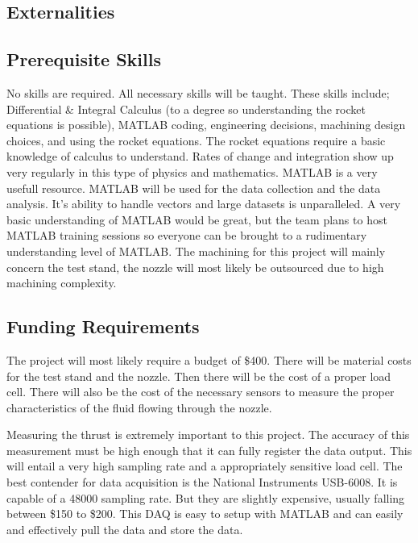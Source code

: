 \documentclass[conference]{IEEEtran} %
\begin{document}
\begin{}
\section{Externalities}
\subsection{Prerequisite Skills}
No skills are required. All necessary skills will be taught. These skills include; Differential \& Integral Calculus (to a degree so understanding the rocket equations is possible), MATLAB coding, engineering decisions, machining design choices, and using the rocket equations. The rocket equations
require a basic knowledge of calculus to understand. Rates of change and integration show up very regularly in this type of physics and mathematics. MATLAB
is a very usefull resource. MATLAB will be used for the data collection and the data analysis. It's ability to handle vectors and large datasets is unparalleled.
A very basic understanding of MATLAB would be great, but the team plans to host MATLAB training sessions so everyone can be brought to a rudimentary understanding
level of MATLAB\@. The machining for this project will mainly concern the test stand, the nozzle will most likely be outsourced due to high machining complexity.

\subsection{Funding Requirements}
The project will most likely require a budget of \$400. There will be material costs for the test stand and the nozzle.
Then there will be the cost of a proper load cell. There will also be the cost of the necessary sensors to measure
 the proper characteristics of the fluid flowing through the nozzle.

Measuring the thrust is extremely important to this project. The accuracy of this measurement must be high enough that it can fully register the data output. This will
entail a very high sampling rate and a appropriately sensitive load cell. The best contender for data acquisition is the National Instruments USB-6008. It is capable of
a 48000 sampling rate. But they are slightly expensive, usually falling between \$150 to \$200. This DAQ is easy to setup with MATLAB and can easily and effectively pull the data and
store the data.


\end{}
\end{document}
